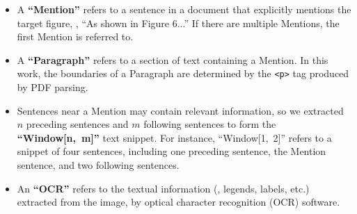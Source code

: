 \begin{itemize} [leftmargin=*,itemsep=0mm]

    \item 
    A \textbf{``Mention''} refers to a sentence in a document that explicitly mentions the target figure, \eg, ``As shown in Figure 6...''
    If there are multiple Mentions, the first Mention is referred to. %




    

    \item 
    
    A \textbf{``Paragraph''} refers to a section of text containing a Mention. In this work, the boundaries of a Paragraph are determined by the \texttt{<p>} tag produced by PDF parsing.









    

    \item 
    Sentences near a Mention may contain relevant information, so we extracted $n$ preceding sentences and $m$ following sentences to form the \textbf{``Window[n,~m]''} text snippet.
    For instance, ``Window[1,~2]'' refers to a snippet of four sentences, including one preceding sentence, the Mention sentence, and two following sentences. %




    \item 
    An \textbf{``OCR''} refers to the textual information (\eg, legends, labels, etc.) extracted from the image, by optical character recognition (OCR) software.


\end{itemize}






